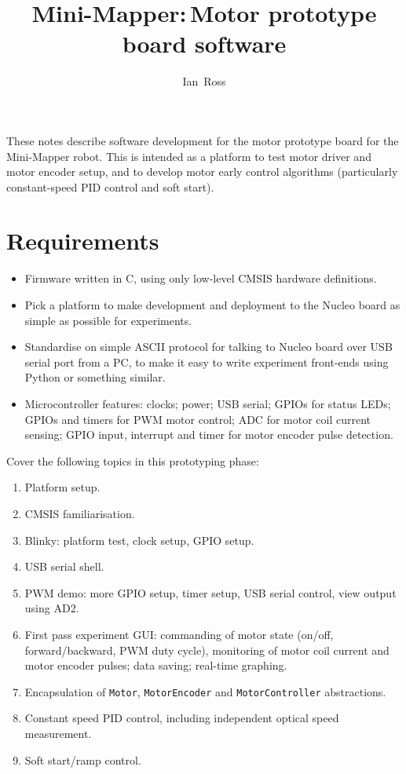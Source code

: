 \documentclass[a4paper,11pt,article]{memoir}
\title{Mini-Mapper:\,Motor prototype board software}
\author{Ian~Ross}
\begin{document}
\maketitle

These notes describe software development for the motor prototype
board for the Mini-Mapper robot. This is intended as a platform to
test motor driver and motor encoder setup, and to develop motor early
control algorithms (particularly constant-speed PID control and soft
start).


\section{Requirements}

\begin{itemize}
  \item{Firmware written in C, using only low-level CMSIS hardware
    definitions.}
  \item{Pick a platform to make development and deployment to the
    Nucleo board as simple as possible for experiments.}
  \item{Standardise on simple ASCII protocol for talking to Nucleo
    board over USB serial port from a PC, to make it easy to write
    experiment front-ends using Python or something similar.}
  \item{Microcontroller features: clocks; power; USB serial; GPIOs for
    status LEDs; GPIOs and timers for PWM motor control; ADC for motor
    coil current sensing; GPIO input, interrupt and timer for motor
    encoder pulse detection.}
\end{itemize}

Cover the following topics in this prototyping phase:
\begin{enumerate}
  \item{Platform setup.}
  \item{CMSIS familiarisation.}
  \item{Blinky: platform test, clock setup, GPIO setup.}
  \item{USB serial shell.}
  \item{PWM demo: more GPIO setup, timer setup, USB serial control,
    view output using AD2.}
  \item{First pass experiment GUI: commanding of motor state (on/off,
    forward/backward, PWM duty cycle), monitoring of motor coil
    current and motor encoder pulses; data saving; real-time
    graphing.}
  \item{Encapsulation of \texttt{Motor}, \texttt{MotorEncoder} and
    \texttt{MotorController} abstractions.}
  \item{Constant speed PID control, including independent optical
    speed measurement.}
  \item{Soft start/ramp control.}
\end{enumerate}
\end{document}
